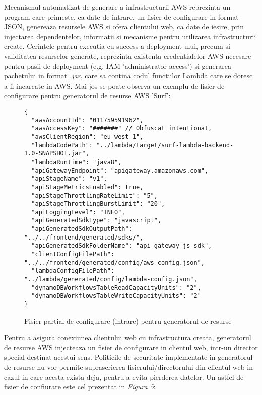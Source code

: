 Mecanismul automatizat de generare a infrastructurii AWS reprezinta un program care primeste, ca date de intrare, un fisier de configurare in format JSON, genereaza resursele AWS si ofera clientului web, ca date de iesire, prin injectarea dependentelor, informatii si mecanisme pentru utilizarea infrastructurii create. Cerintele pentru executia cu success a deployment-ului, precum si validitatea resurselor generate, reprezinta existenta credentialelor AWS necesare pentru pasii de deployment (e.g. IAM 'administrator-access') si generarea pachetului in format \emph{.jar}, care sa contina codul functiilor Lambda care se doresc a fi incarcate in AWS. Mai jos se poate observa un exemplu de fisier de configurare pentru generatorul de resurse AWS 'Surf':

\begin{figure}[ht]
\begin{verbatim}
{
  "awsAccountId": "011759591962",
  "awsAccessKey": "#######" // Obfuscat intentionat,
  "awsClientRegion": "eu-west-1",
  "lambdaCodePath": "../lambda/target/surf-lambda-backend-1.0-SNAPSHOT.jar",
  "lambdaRuntime": "java8",
  "apiGatewayEndpoint": "apigateway.amazonaws.com",
  "apiStageName": "v1",
  "apiStageMetricsEnabled": true,
  "apiStageThrottlingRateLimit": "5",
  "apiStageThrottlingBurstLimit": "20",
  "apiLoggingLevel": "INFO",
  "apiGeneratedSdkType": "javascript",
  "apiGeneratedSdkOutputPath": "../../frontend/generated/sdks/",
  "apiGeneratedSdkFolderName": "api-gateway-js-sdk",
  "clientConfigFilePath": "../../frontend/generated/config/aws-config.json",
  "lambdaConfigFilePath": "../lambda/generated/config/lambda-config.json",
  "dynamoDBWorkflowsTableReadCapacityUnits": "2",
  "dynamoDBWorkflowsTableWriteCapacityUnits": "2"
}
\end{verbatim}
\begin{center}
	\caption{Fisier partial de configurare (intrare) pentru generatorul de resurse}\par\medskip
	\vspace*{-20pt}
\end{center}
\end{figure}

Pentru a asigura conexiunea clientului web cu infrastructura creata, generatorul de resurse AWS injecteaza un fisier de configurare in clientul web, intr-un director special destinat acestui sens. Politicile de securitate implementate in generatorul de resurse nu vor permite suprascrierea fisierului/directorului din clientul web in cazul in care acesta exista deja, pentru a evita pierderea datelor. Un astfel de fisier de confiurare este cel prezentat in \textit{Figura 5}:
\\

